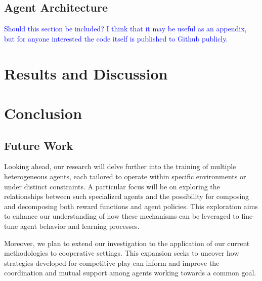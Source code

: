 \documentclass[journal]{IEEEtran}
\begin{document}
	\subsection{Agent Architecture}
	
	\textcolor{blue}{Should this section be included? I think that it may be useful as an appendix, but for anyone interested the code itself is published to Github publicly.}
	
	\begin{comment}		
		The board state is held between turns using the python-chess api.
		The state is passed to the agent as a pair of \(8\times8\times7\) tensors representing a copy of the board for each of the \(7\) types of pieces. 
		
	\end{comment}
	
	\section{Results and Discussion}
	\label{sec:results_discussion}
	
	\textcolor{lightgray}{\blindtext}
	\begin{comment}
		Significant performance in predicting the moves that the stockfish engine will make next.
	\end{comment}
	
	
	\section{Conclusion}
	\label{sec:conclusion}
	\textcolor{lightgray}{\blindtext}

	\subsection{Future Work}
		Looking ahead, our research will delve further into the training of multiple heterogeneous agents, 
		each tailored to operate within specific environments or under distinct constraints. 
		A particular focus will be on exploring the relationships between such specialized agents and the 
		possibility for composing and decomposing both reward functions and agent policies. 
		This exploration aims to enhance our understanding of how these mechanisms can be leveraged to 
		fine-tune agent behavior and learning processes.
	
		Moreover, we plan to extend our investigation to the application of our current methodologies to cooperative settings. 
		This expansion seeks to uncover how strategies developed for competitive play can inform and 
		improve the coordination and mutual support among agents working towards a common goal.
	
\end{document}
